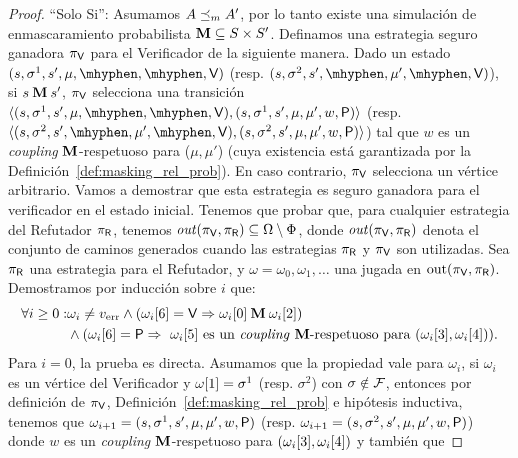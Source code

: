 \begin{proof}
\noindent ``Solo Si'': Asumamos $A \Masking A'$, por lo tanto existe una simulación de enmascaramiento probabilista $\M \subseteq S \times S'$.
Definamos una estrategia seguro ganadora  $\strat{\Verifier}$ para el Verificador de la siguiente manera.
Dado un estado $(s, \sigma^1, s', \mu, \mhyphen, \mhyphen, \Verifier)$ (resp. $(s, \sigma^2, s', \mhyphen, \mu', \mhyphen, \Verifier)$), si $s \M  s'$, $\strat{\Verifier}$ selecciona una transición
$\langle (s, \sigma^1, s', \mu, \mhyphen, \mhyphen, \Verifier), (s, \sigma^1, s', \mu, \mu', w, \Probabilistic)\rangle$ (resp. $\langle (s, \sigma^2, s', \mhyphen, \mu', \mhyphen, \Verifier),(s, \sigma^2, s', \mu, \mu', w, \Probabilistic)\rangle$) tal que $w$ es un \emph{coupling} $\M$-respetuoso para ($\mu,\mu'$) 
(cuya existencia está garantizada por la Definición~\ref{def:masking_rel_prob}). En caso contrario, $\strat{\Verifier}$ selecciona un vértice arbitrario. 
Vamos a demostrar que esta estrategia es seguro ganadora para el verificador en el estado inicial.
Tenemos que probar que, para cualquier estrategia del Refutador $\strat{\Refuter}$, tenemos $\out(\strat{\Verifier}, \strat{\Refuter}) \subseteq\Omega \setminus \Phi$, donde $\out(\strat{\Verifier}, \strat{\Refuter})$ denota el conjunto de caminos generados cuando las estrategias $\strat{\Refuter}$ y $\strat{\Verifier}$ son utilizadas.  Sea $\strat{\Refuter}$ una estrategia para el Refutador, y $\omega = \omega_0, \omega_1,  \dots$ una jugada en $\text{out}(\strat{\Verifier}, \strat{\Refuter})$. 
Demostramos por inducción sobre $i$ que:
\begin{align} 
\forall i \geq 0: & \omega_i \neq \ErrorSt \wedge (\pr{6}{\omega_i} = \Verifier \Rightarrow \pr{0}{\omega_i} \M  \pr{2}{\omega_i}) \nonumber \\ 
&\wedge (\pr{6}{\omega_i} = \Probabilistic \Rightarrow \text{ $\pr{5}{\omega_i}$ es un \emph{coupling} $\M$-respetuoso para $(\pr{3}{\omega_i},  \pr{4}{\omega_i})$}). \label{eq1:thm:wingame_strat_prob}
\end{align}
Para $i=0$, la prueba es directa. Asumamos que la propiedad vale para $\omega_i$, si $\omega_i$ es un vértice del Verificador y 
$\pr{1}{\omega} = \sigma^1$ (resp. $\sigma^2$) con $\sigma \notin \faults$, entonces por definición de $\strat{\Verifier}$, Definición~\ref{def:masking_rel_prob} e hipótesis inductiva, 
tenemos que $\omega_{i+1} =  (s, \sigma^1, s', \mu, \mu', w,  \Probabilistic)$
(resp. $\omega_{i+1} =  (s, \sigma^2, s', \mu, \mu', w, \Probabilistic)$) donde $w$ es un \emph{coupling}
$\M$-respetuoso para $(\pr{3}{\omega_i},  \pr{4}{\omega_i})$ y también que  

\end{proof}
